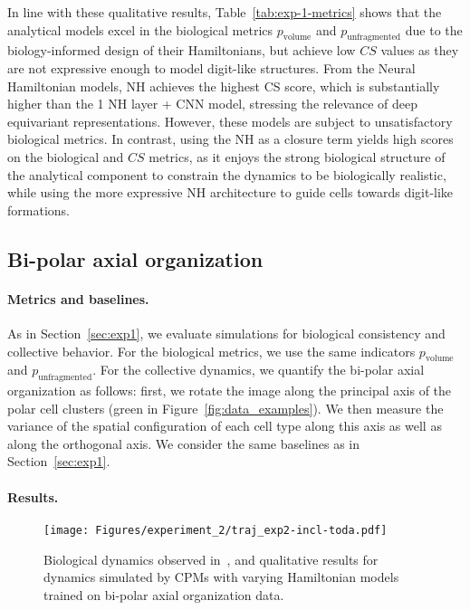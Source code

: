 In line with these qualitative results, Table~\ref{tab:exp-1-metrics} shows that the analytical models excel in the biological metrics $p_\text{volume}$ and $p_\text{unfragmented}$ due to the biology-informed design of their Hamiltonians, but achieve low $CS$ values as they are not expressive enough to model digit-like structures. From the Neural Hamiltonian models, NH achieves the highest CS score, which is substantially higher than the 1 NH layer + CNN model, stressing the relevance of deep equivariant representations. However, these models are subject to unsatisfactory biological metrics. In contrast, using the NH as a closure term yields high scores on the biological and $CS$ metrics, as it enjoys the strong biological structure of the analytical component to constrain the dynamics to be biologically realistic, while using the more expressive NH architecture to guide cells towards digit-like formations. 




\subsection{Bi-polar axial organization}\label{sec:exp2}

\paragraph{Metrics and baselines.}

As in Section~\ref{sec:exp1}, we evaluate simulations for biological consistency and collective behavior. For the biological metrics, we use the same indicators $p_\text{volume}$ and $p_\text{unfragmented}$. For the collective dynamics, we quantify the bi-polar axial organization as follows: first, we rotate the image along the principal axis of the polar cell clusters (green in Figure~\ref{fig:data_examples}). We then measure the variance of the spatial configuration of each cell type along this axis as well as along the orthogonal axis. We consider the same baselines as in Section~\ref{sec:exp1}.


\paragraph{Results.}


\begin{figure}[t]
    \centering
    \texttt{[image: Figures/experiment\_2/traj\_exp2-incl-toda.pdf]}
    \caption{Biological dynamics observed in~\citet{Toda2018Science}, and qualitative results for dynamics simulated by CPMs with varying Hamiltonian models trained on bi-polar axial organization data.}
    \label{fig:exp-2-qualitative}
\end{figure}

